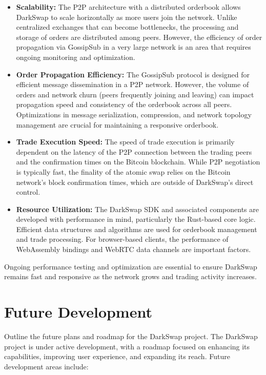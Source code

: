 \documentclass{article}
\begin{document}
\begin{itemize}
    \item \textbf{Scalability:} The P2P architecture with a distributed orderbook allows DarkSwap to scale horizontally as more users join the network. Unlike centralized exchanges that can become bottlenecks, the processing and storage of orders are distributed among peers. However, the efficiency of order propagation via GossipSub in a very large network is an area that requires ongoing monitoring and optimization.
    \item \textbf{Order Propagation Efficiency:} The GossipSub protocol is designed for efficient message dissemination in a P2P network. However, the volume of orders and network churn (peers frequently joining and leaving) can impact propagation speed and consistency of the orderbook across all peers. Optimizations in message serialization, compression, and network topology management are crucial for maintaining a responsive orderbook.
    \item \textbf{Trade Execution Speed:} The speed of trade execution is primarily dependent on the latency of the P2P connection between the trading peers and the confirmation times on the Bitcoin blockchain. While P2P negotiation is typically fast, the finality of the atomic swap relies on the Bitcoin network's block confirmation times, which are outside of DarkSwap's direct control.
    \item \textbf{Resource Utilization:} The DarkSwap SDK and associated components are developed with performance in mind, particularly the Rust-based core logic. Efficient data structures and algorithms are used for orderbook management and trade processing. For browser-based clients, the performance of WebAssembly bindings and WebRTC data channels are important factors.
\end{itemize}

Ongoing performance testing and optimization are essential to ensure DarkSwap remains fast and responsive as the network grows and trading activity increases.

\section{Future Development}
Outline the future plans and roadmap for the DarkSwap project.
The DarkSwap project is under active development, with a roadmap focused on enhancing its capabilities, improving user experience, and expanding its reach. Future development areas include:
\end{document}
